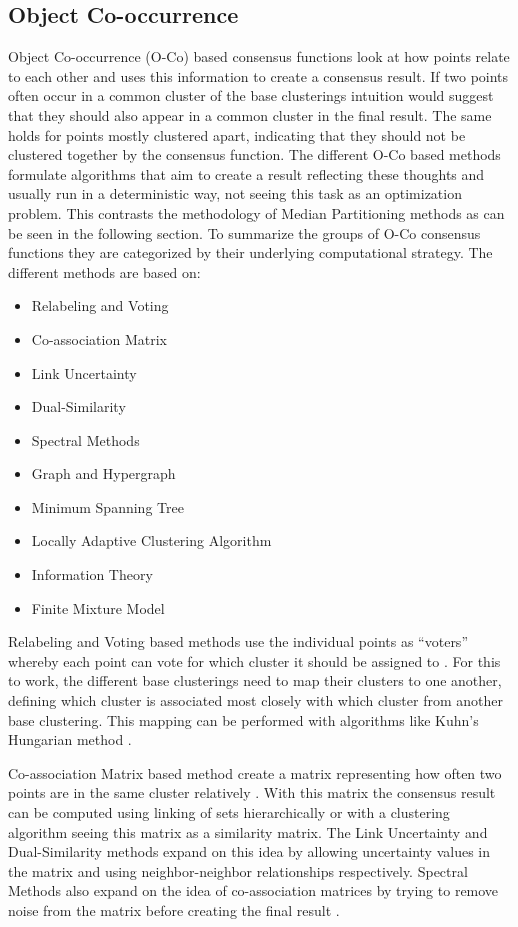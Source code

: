 \documentclass[
	a4paper,
	english,
	twoside,
	openright,               
	11pt                            
	]{report}
\begin{document}
\subsection{Object Co-occurrence}
Object Co-occurrence (O-Co) based consensus functions look at how points relate to each other and uses this information to create a consensus result. If two points often occur in a common cluster of the base clusterings intuition would suggest that they should also appear in a common cluster in the final result. The same holds for points mostly clustered apart, indicating that they should not be clustered together by the consensus function. The different O-Co based methods formulate algorithms that aim to create a result reflecting these thoughts and usually run in a deterministic way, not seeing this task as an optimization problem. This contrasts the methodology of Median Partitioning methods as can be seen in the following section. To summarize the groups of O-Co consensus functions they are categorized by their underlying computational strategy. The different methods are based on:

\begin{itemize}
  \item Relabeling and Voting
  \item Co-association Matrix
  \item Link Uncertainty
  \item Dual-Similarity
  \item Spectral Methods
  \item Graph and Hypergraph
  \item Minimum Spanning Tree
  \item Locally Adaptive Clustering Algorithm
  \item Information Theory
  \item Finite Mixture Model
\end{itemize}

Relabeling and Voting based methods use the individual points as  ``voters'' whereby each point can vote for which cluster it should be assigned to \cite{4470298}. For this to work, the different base clusterings need to map their clusters to one another, defining which cluster is associated most closely with which cluster from another base clustering. This mapping can be performed with algorithms like Kuhn’s Hungarian method \cite{Kuhn2010}.

Co-association Matrix based method create a matrix representing how often two points are in the same cluster relatively  \cite{Monti2003}. With this matrix the consensus result can be computed using linking of sets hierarchically or with a clustering algorithm seeing this matrix as a similarity matrix. The Link Uncertainty \cite{6413733} and Dual-Similarity \cite{7344797} methods expand on this idea by allowing uncertainty values in the matrix and using neighbor-neighbor relationships respectively. Spectral Methods also expand on the idea of co-association matrices by trying to remove noise from the matrix before creating the final result \cite{Tao:2016:RSE:2983323.2983745}.
\end{document}
